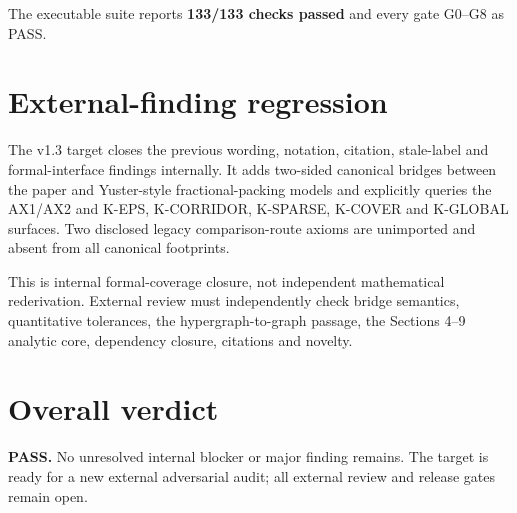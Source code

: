 \documentclass[11pt]{article}
\begin{document}
The executable suite reports \textbf{133/133 checks passed} and every gate
G0--G8 as PASS.

\section{External-finding regression}
The v1.3 target closes the previous wording, notation, citation, stale-label and
formal-interface findings internally. It adds two-sided canonical bridges
between the paper and Yuster-style fractional-packing models and explicitly
queries the AX1/AX2 and K-EPS, K-CORRIDOR, K-SPARSE, K-COVER and K-GLOBAL
surfaces. Two disclosed legacy comparison-route axioms are unimported and absent
from all canonical footprints.

This is internal formal-coverage closure, not independent mathematical
rederivation. External review must independently check bridge semantics,
quantitative tolerances, the hypergraph-to-graph passage, the Sections 4--9
analytic core, dependency closure, citations and novelty.

\section{Overall verdict}
\textbf{PASS.} No unresolved internal blocker or major finding remains. The
target is ready for a new external adversarial audit; all external review and
release gates remain open.
\end{document}
